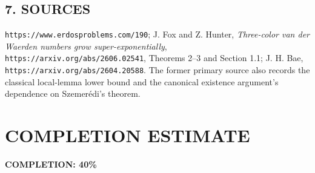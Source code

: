 \subsection*{7. SOURCES}
\texttt{https://www.erdosproblems.com/190}; J. Fox and Z. Hunter, \emph{Three-color van der Waerden numbers grow super-exponentially}, \texttt{https://arxiv.org/abs/2606.02541}, Theorems 2--3 and Section 1.1; J. H. Bae, \texttt{https://arxiv.org/abs/2604.20588}. The former primary source also records the classical local-lemma lower bound and the canonical existence argument's dependence on Szemer\'edi's theorem.
\section{COMPLETION ESTIMATE}
\textbf{COMPLETION: 40\%}
